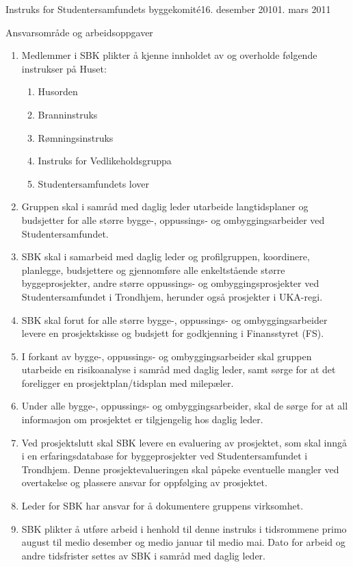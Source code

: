 \begin{instruks}{Instruks for Studentersamfundets byggekomité}{16. desember 2010}{1. mars 2011}
    \begin{instruksledd}{ Ansvarsområde og arbeidsoppgaver}
        \begin{enumerate}
            \item Medlemmer i SBK plikter å kjenne innholdet av og overholde følgende instrukser på
                Huset:
                \begin{enumerate}
                    \item Husorden
                    \item Branninstruks
                    \item Rømningsinstruks
                    \item Instruks for Vedlikeholdsgruppa
                    \item Studentersamfundets lover
                \end{enumerate}
            \item Gruppen skal i samråd med daglig leder utarbeide langtidsplaner og
                budsjetter for alle større bygge-,
                oppussings- og ombyggingsarbeider ved Studentersamfundet.
            \item SBK skal i samarbeid med daglig leder og profilgruppen, koordinere,
                planlegge, budsjettere og gjennomføre
                alle enkeltstående større byggeprosjekter, andre større oppussings- og
                ombyggingsprosjekter ved Studentersamfundet i Trondhjem, herunder også prosjekter i UKA-regi.
	    \item SBK skal forut for alle større bygge-, oppussings- og ombyggingsarbeider levere en prosjektskisse og
                budsjett for godkjenning i Finansstyret (FS).
            \item I forkant av bygge-, oppussings- og ombyggingsarbeider skal gruppen
                utarbeide en risikoanalyse i samråd med daglig leder, samt sørge
		for at det foreligger en prosjektplan/tidsplan med milepæler.
            \item Under alle bygge-, oppussings- og ombyggingsarbeider, skal de sørge for
                at all informasjon om prosjektet er tilgjengelig hos daglig leder.
            \item Ved prosjektslutt skal SBK levere en evaluering av prosjektet, som skal inngå
                i en erfaringsdatabase for byggeprosjekter ved Studentersamfundet i Trondhjem. Denne
                prosjektevalueringen skal påpeke eventuelle
                mangler ved overtakelse og plassere ansvar for oppfølging av prosjektet.
            \item Leder for SBK har ansvar for å dokumentere gruppens virksomhet.
            \item SBK plikter å utføre arbeid i henhold til denne instruks i tidsrommene
                primo august til medio desember og medio januar til medio mai. Dato for arbeid og 
		andre tidsfrister settes av SBK i samråd med daglig leder.
        \end{enumerate}
    \end{instruksledd}


\end{instruks}
